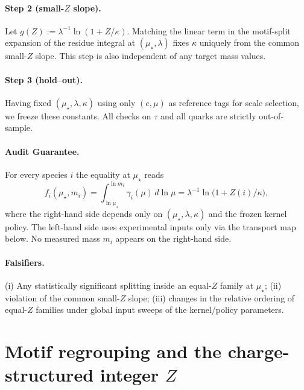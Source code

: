 \documentclass[epjc3]{svjour3}
\begin{document}
\paragraph{Step 2 (small-$Z$ slope).}
Let $g(Z):=\lambda^{-1}\ln(1+Z/\kappa)$. Matching the linear term in the motif-split expansion of the residue integral at $(\mu_\star,\lambda)$ fixes $\kappa$ uniquely from the common small-$Z$ slope. This step is also independent of any target mass values.

\paragraph{Step 3 (hold–out).}
Having fixed $(\mu_\star,\lambda,\kappa)$ using only $(e,\mu)$ as reference tags for scale selection, we freeze these constants. All checks on $\tau$ and all quarks are strictly out-of-sample.

\paragraph{Audit Guarantee.}
For every species $i$ the equality at $\mu_\star$ reads
\[
f_i(\mu_\star,m_i)=\int_{\ln\mu_\star}^{\ln m_i}\gamma_i(\mu)\,d\ln\mu
=\lambda^{-1}\ln\!\bigl(1+Z(i)/\kappa\bigr),
\]
where the right-hand side depends only on $(\mu_\star,\lambda,\kappa)$ and the frozen kernel policy. The left-hand side uses experimental inputs only via the transport map below. No measured mass $m_i$ appears on the right-hand side.

\paragraph{Falsifiers.}
(i) Any statistically significant splitting inside an equal-$Z$ family at $\mu_\star$; (ii) violation of the common small-$Z$ slope; (iii) changes in the relative ordering of equal-$Z$ families under global input sweeps of the kernel/policy parameters.

\section{Motif regrouping and the charge-structured integer $Z$}
\end{document}

